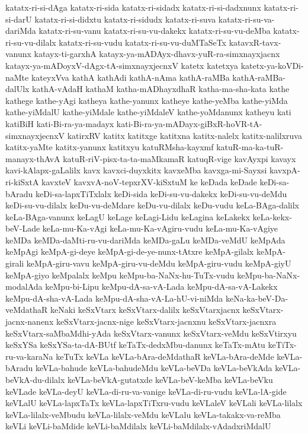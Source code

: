 {katatx-ri-si-dAga
katatx-ri-sida
katatx-ri-sidadx
katatx-ri-si-dadxnunx
katatx-ri-si-darU
katatx-ri-si-didxtu
katatx-ri-sidudx
katatx-ri-suva
katatx-ri-su-va-dariMda
katatx-ri-su-vanu
katatx-ri-su-vu-dakekx
katatx-ri-su-vu-deMba
katatx-ri-su-vu-dilalx
katatx-ri-su-vudu
katatx-ri-su-vu-duMTaSeTx
katavxR-tavx-vanunx
katayx-ti-garxhA
katayx-ya-mADAyx-dhavx-yuR-ra-simxnayxjacnx
katayx-ya-mADoyxV-dAgx-tA-simxnayxjecnxV
katetx
katetxya
katetx-ya-koVDi-naMte
kateyxVva
kathA
kathAdi
kathA-nAma
kathA-raMBa
kathA-raMBa-dalUlx
kathA-vAdaH
kathaM
katha-mADhayxdhaR
katha-ma-sha-kata
kathe
kathege
kathe-yAgi
katheya
kathe-yanunx
katheye
kathe-yeMba
kathe-yiMda
kathe-yiMdalU
kathe-yiMdale
kathe-yiMdaleV
kathe-yoMdanunx
katheyu
kati
katiBiH
kati-Bi-ra-ya-madayx
kati-Bi-ra-ya-mADayx-giBxR-hoVR-tA-simxnayxjecnxV
katirxRV
katitx
katitxge
katitxna
katitx-nalelx
katitx-nalilxruva
katitx-yaMte
katitx-yanunx
katitxyu
katuRMsha-kayxmf
katuR-ma-ka-tuR-manayx-thAvA
katuR-riV-pisx-ta-ta-maMkamaR
katuqR-vige
kavAyxpi
kavayx
kavi-kAlapx-gaLalilx
kavx
kavxci-duyxkitx
kavxeMba
kavxga-mi-Sayxsi
kavxpA-ri-kiSxtA
kavxteV
kavxvA-noV-tepxrXV-kiSxtuM
ke
keDada
keDade
keDi-sa-bAradu
keDi-sa-lapxTiTxlalx
keDi-sida
keDi-su-vu-dakekx
keDi-su-vu-deMdu
keDi-su-vu-dilalx
keDu-vu-deMdare
keDu-vu-dilalx
keDu-vudu
keLa-BAga-dalilx
keLa-BAga-vanunx
keLagU
keLage
keLagi-Lidu
keLagina
keLakekx
keLa-kekx-beV-Lade
keLa-mu-Ka-vAgi
keLa-mu-Ka-vAgiru-vudu
keLa-mu-Ka-vAgiye
keMDa
keMDa-daMti-ru-vu-dariMda
keMDa-gaLu
keMDa-veMdU
keMpAda
keMpAgi
keMpA-gi-deye
keMpA-gi-de-ye-nunx-tAtxre
keMpA-gilalx
keMpA-girali
keMpA-giru-vavu
keMpA-giru-vu-deMdu
keMpA-giru-vudu
keMpA-giyU
keMpA-giyo
keMpalalx
keMpu
keMpu-ba-NaNx-hu-TuTx-vudu
keMpu-ba-NaNx-modalAda
keMpu-bi-Lipu
keMpu-dA-sa-vA-Lada
keMpu-dA-sa-vA-Lakekx
keMpu-dA-sha-vA-Lada
keMpu-dA-sha-vA-La-hU-vi-niMda
keNa-ka-beV-Da-veMdathaR
keNaki
keSxVtarx
keSxVtarx-dalilx
keSxVtarxjacnx
keSxVtarx-jacnx-nanenx
keSxVtarx-jacnx-nige
keSxVtarx-jacnxnu
keSxVtarx-jacnxra
keSxVtarx-saMbaMdhi-yAda
keSxVtarx-vanunx
keSxVtarx-veMdu
keSxVtirxyu
keSxYSa
keSxYSa-ta-dA-BUtf
keTaTx-dedxMbu-danunx
keTaTx-mAtu
keTiTx-ru-va-karaNa
keTuTx
keVLa
keVLa-bAra-deMdathaR
keVLa-bAra-deMde
keVLa-bAradu
keVLa-bahude
keVLa-bahudeMdu
keVLa-beVDa
keVLa-beVkAda
keVLa-beVkA-du-dilalx
keVLa-beVkA-gutatxde
keVLa-beV-keMba
keVLa-beVku
keVLade
keVLa-deyU
keVLa-di-ru-va-vanige
keVLa-di-ru-vudu
keVLa-lA-gide
keVLalU
keVLa-lapxTaTx
keVLa-lapxTiTxru-vudu
keVLaleV
keVLali
keVLa-lilalx
keVLa-lilalx-veMbudu
keVLa-lilalx-veMdu
keVLalu
keVLa-takakx-va-reMba
keVLi
keVLi-baMdide
keVLi-baMdilalx
keVLi-baMdilalx-vAdadxriMdalU
}
